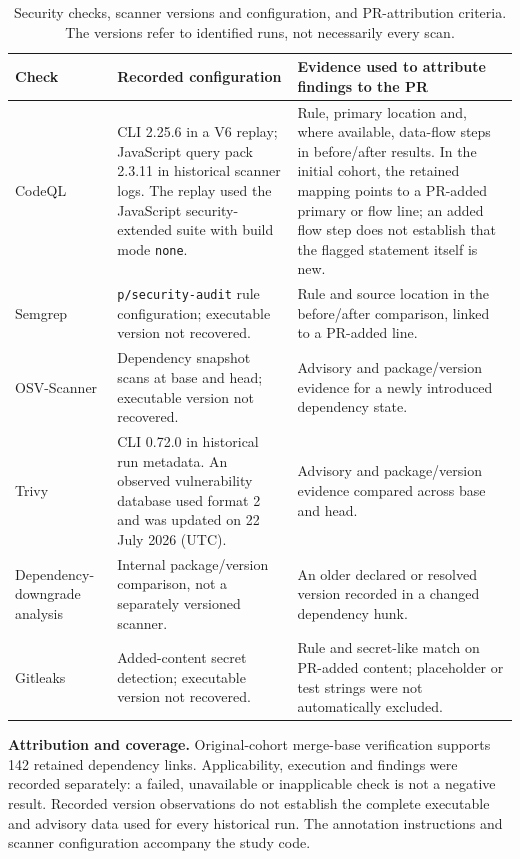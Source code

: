 \begin{table}[H]
\caption{Security checks, scanner versions and configuration, and PR-attribution criteria. The versions refer to identified runs, not necessarily every scan.}
\label{tab:scanners}
\footnotesize\renewcommand{\arraystretch}{1.15}
\begin{tabularx}{\linewidth}{@{}L{1.65cm}L{3.05cm}Y@{}}
\toprule
\textbf{Check} & \textbf{Recorded configuration} & \textbf{Evidence used to attribute findings to the PR}\\
\midrule
CodeQL & CLI 2.25.6 in a V6 replay; JavaScript query pack 2.3.11 in historical scanner logs. The replay used the JavaScript security-extended suite with build mode \texttt{none}. & Rule, primary location and, where available, data-flow steps in before/after results. In the initial cohort, the retained mapping points to a PR-added primary or flow line; an added flow step does not establish that the flagged statement itself is new.\\
Semgrep & \texttt{p/security-audit} rule configuration; executable version not recovered. & Rule and source location in the before/after comparison, linked to a PR-added line.\\
OSV-Scanner & Dependency snapshot scans at base and head; executable version not recovered. & Advisory and package/version evidence for a newly introduced dependency state.\\
Trivy & CLI 0.72.0 in historical run metadata. An observed vulnerability database used format 2 and was updated on 22 July 2026 (UTC). & Advisory and package/version evidence compared across base and head.\\
Dependency-downgrade analysis & Internal package/version comparison, not a separately versioned scanner. & An older declared or resolved version recorded in a changed dependency hunk.\\
Gitleaks & Added-content secret detection; executable version not recovered. & Rule and secret-like match on PR-added content; placeholder or test strings were not automatically excluded.\\
\bottomrule
\end{tabularx}
\par\smallskip\raggedright\scriptsize
\textbf{Attribution and coverage.} Original-cohort merge-base verification supports 142 retained dependency links. Applicability, execution and findings were recorded separately: a failed, unavailable or inapplicable check is not a negative result. Recorded version observations do not establish the complete executable and advisory data used for every historical run. The annotation instructions and scanner configuration accompany the study code.
\end{table}

